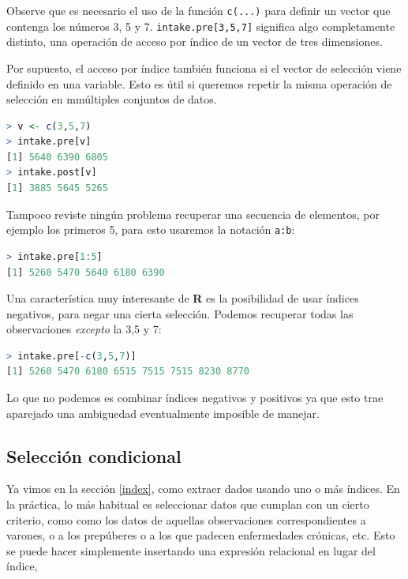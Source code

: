 Observe que es necesario el uso de la función \texttt{c(...)} para definir un
vector que contenga los números 3, 5 y 7. \texttt{intake.pre[3,5,7]} significa
algo completamente distinto, una operación de acceso por índice de un vector de
tres dimensiones.

Por supuesto, el acceso por índice también funciona si el vector de selección
viene definido en una variable. Esto es útil si queremos repetir la misma
operación de selección en mmúltiples conjuntos de datos.

\begin{lstlisting}[language=R]
> v <- c(3,5,7)
> intake.pre[v]
[1] 5640 6390 6805
> intake.post[v]
[1] 3885 5645 5265
\end{lstlisting}

Tampoco reviste ningún problema recuperar una secuencia de elementos, por
ejemplo los primeros 5, para esto usaremos la notación \texttt{a:b}:

\begin{lstlisting}[language=R]
> intake.pre[1:5]
[1] 5260 5470 5640 6180 6390
\end{lstlisting}


Una característica muy interesante de \textbf{R} es la posibilidad de usar
índices negativos, para negar una cierta selección. Podemos recuperar todas
las observaciones \textit{excepto} la 3,5 y 7:

\begin{lstlisting}[language=R]
> intake.pre[-c(3,5,7)]
[1] 5260 5470 6180 6515 7515 7515 8230 8770
\end{lstlisting}

Lo que no podemos es combinar índices negativos y positivos ya que esto trae
aparejado una ambiguedad eventualmente imposible de manejar.

\subsection{Selección condicional}

Ya vimos en la sección \ref{index}, como extraer dados usando uno o más
índices. En la práctica, lo más habitual es seleccionar datos que cumplan con
un cierto criterio, como como los datos de aquellas observaciones
correspondientes a varones, o a los prepúberes o a los que padecen enfermedades
crónicas, etc. Esto se puede hacer simplemente insertando una expresión
relacional en lugar del índice,

